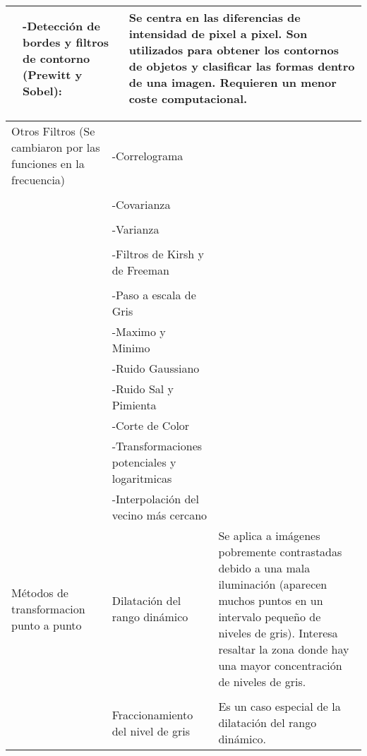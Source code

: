 \documentclass[letterpaper]{article}
\begin{document}
\begin{table}[H]
\begin{tabular}[13cm]{ 
    >{\centering\arraybackslash}m{3cm} 
    >{}m{5cm} 
    >{}m{5cm}}
         & -Detección de bordes y filtros de contorno (Prewitt y Sobel): & Se centra en las diferencias de intensidad de pixel a pixel. Son utilizados para obtener los contornos de objetos y clasificar las formas dentro de una imagen. Requieren un menor coste computacional. \\ 
         
         \bottomrule
        
	\end{tabular}
    
\end{table}

\begin{table}[H]

	\centering
    
	\begin{tabular}[10cm]{ 
    >{\centering\arraybackslash}m{3cm} 
    >{}m{5cm} 
    >{}m{5cm}}
        
        
        \midrule
        
         Otros Filtros (Se cambiaron por las funciones en la frecuencia)
         
         & -Correlograma & \\ \\
         & -Covarianza &  \\ \\
         & -Varianza & \\ \\
         & -Filtros de Kirsh y de Freeman &\\ \\
         & -Paso a escala de Gris & \\
         & -Maximo y Minimo & \\
         & -Ruido Gaussiano & \\
         & -Ruido Sal y Pimienta &\\
         & -Corte de Color &\\
         & -Transformaciones potenciales y logaritmicas& \\
         & -Interpolación del vecino más cercano & \\
       
        
        \midrule
        
        Métodos de transformacion punto a punto 
        
        & Dilatación del rango dinámico  & Se aplica a imágenes pobremente contrastadas debido a una mala iluminación (aparecen muchos puntos en un intervalo pequeño de niveles de gris). Interesa resaltar la zona donde hay una mayor concentración de niveles de gris. \\ \\


		& Fraccionamiento del nivel de gris & Es un caso especial de la dilatación del rango dinámico. \\
       
       \bottomrule
        
	\end{tabular}
    
\end{table}
\end{document}
